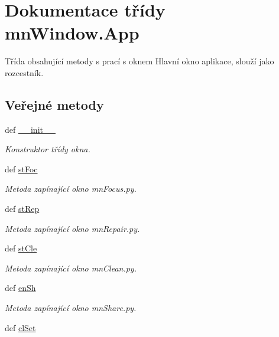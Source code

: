 \hypertarget{classmnWindow_1_1App}{\section{Dokumentace třídy mn\-Window.\-App}
\label{d4/d8e/classmnWindow_1_1App}
}


Třída obsahující metody s prací s oknem Hlavní okno aplikace, slouží jako rozcestník.  


\subsection*{Veřejné metody}
\begin{DoxyCompactItemize}
\item 
def \hyperlink{classmnWindow_1_1App_ab0d57eebcf6c963177340604c8aa783a}{\-\_\-\-\_\-init\-\_\-\-\_\-}
\begin{DoxyCompactList}\small\item\em Konstruktor třídy okna. \end{DoxyCompactList}\item 
def \hyperlink{classmnWindow_1_1App_ab4ef24c1346b73a656accc797f8efbf8}{st\-Foc}
\begin{DoxyCompactList}\small\item\em Metoda zapínající okno mn\-Focus.\-py. \end{DoxyCompactList}\item 
def \hyperlink{classmnWindow_1_1App_ae1a8f341e8aad4f86fe54ad373b4c923}{st\-Rep}
\begin{DoxyCompactList}\small\item\em Metoda zapínající okno mn\-Repair.\-py. \end{DoxyCompactList}\item 
def \hyperlink{classmnWindow_1_1App_adc58e827583658bb4a0ffa7289c53b83}{st\-Cle}
\begin{DoxyCompactList}\small\item\em Metoda zapínající okno mn\-Clean.\-py. \end{DoxyCompactList}\item 
def \hyperlink{classmnWindow_1_1App_a86cbf46093e06025be84feab1d5b817a}{en\-Sh}
\begin{DoxyCompactList}\small\item\em Metoda zapínající okno mn\-Share.\-py. \end{DoxyCompactList}\item 
def \hyperlink{classmnWindow_1_1App_a9c892833aaab9a00f5e04afd5cfc83bf}{cl\-Set}

\end{DoxyCompactItemize}
